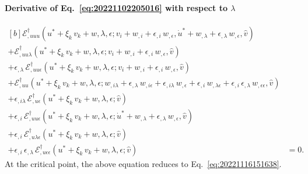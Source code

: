\documentclass[12pt, final]{scrartcl}
\theoremstyle{definition}
\newcommand{\E}{\mathcal E}
\newcommand{\EE}{\mathcal E ^ \dagger}
\begin{document}
\paragraph{Derivative of Eq.~\eqref{eq:20221102205016} with respect to \(\lambda\)}
\begin{equation}
  \label{eq:20221116061057}
  \begin{aligned}[b]
    \EE_{,uuu}(u^\ast + \xi_k \, v_k + w, \lambda, \epsilon; v_i + w_{,i} + \epsilon_{,i} \, w_{,\epsilon}, \dot{u}^\ast + w_{,\lambda} + \epsilon_{,\lambda} \, w_{,\epsilon}, \hat{v})&\\
    + \EE_{,uu\lambda}(u^\ast + \xi_k \, v_k + w, \lambda, \epsilon; v_i + w_{,i} + \epsilon_{,i} \, w_{,\epsilon}, \hat{v})&\\
    + \epsilon_{,\lambda} \, \EE_{,uu\epsilon}(u^\ast + \xi_k \, v_k + w, \lambda, \epsilon; v_i + w_{,i} + \epsilon_{,i} \, w_{,\epsilon}, \hat{v})&\\
    + \EE_{,uu}(u^\ast + \xi_k \, v_k + w, \lambda, \epsilon; w_{,i\lambda} + \epsilon_{,\lambda} \, w_{,i\epsilon} + \epsilon_{,i\lambda} \, w_{,\epsilon} + \epsilon_{,i} \, w_{,\lambda\epsilon} + \epsilon_{,i} \, \epsilon_{,\lambda} \, w_{,\epsilon\epsilon}, \hat{v}) &\\
    + \epsilon_{,i\lambda} \, \EE_{,u\epsilon}(u^\ast + \xi_k \, v_k + w, \lambda, \epsilon; \hat{v}) &\\
    + \epsilon_{,i} \, \EE_{,uu\epsilon}(u^\ast + \xi_k \, v_k + w, \lambda, \epsilon; \dot{u}^\ast + w_{,\lambda} + \epsilon_{,\lambda} \, w_{,\epsilon}, \hat{v}) &\\
    + \epsilon_{,i} \, \EE_{,u\lambda\epsilon}(u^\ast + \xi_k \, v_k + w, \lambda, \epsilon; \hat{v}) &\\
    + \epsilon_{,i} \, \epsilon_{,\lambda} \, \EE_{,u\epsilon\epsilon}(u^\ast + \xi_k \, v_k + w, \lambda, \epsilon; \hat{v}) &= 0.
  \end{aligned}
\end{equation}
At the critical point, the above equation reduces to Eq.~\eqref{eq:20221116151638}.
\end{document}
